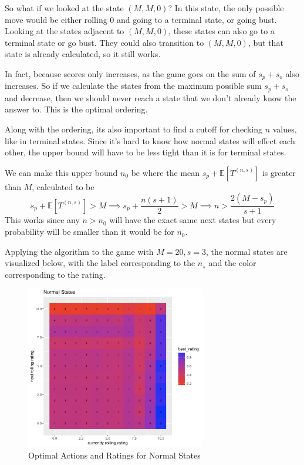 \documentclass[a4paper]{article}
\begin{document}
So what if we looked at the state $(M, M, 0)$? In this state, the only possible move would be either rolling $0$ and going to a terminal state, or going bust. Looking at the states adjacent to $(M, M, 0)$, these states can also go to a terminal state or go bust. They could also transition to $(M, M, 0)$, but that state is already calculated, so it still works. 

In fact, because scores only increases, as the game goes on the sum of $s_p + s_o$ also increases. So if we calculate the states from the maximum possible sum $s_p + s_o$ and decrease, then we should never reach a state that we don't already know the answer to. This is the optimal ordering.


Along with the ordering, its also important to find a cutoff for checking $n$ values, like in terminal states. Since it's hard to know how normal states will effect each other, the upper bound will have to be less tight than it is for terminal states. 

We can make this upper bound $n_0$ be where the mean $s_p + \mathbb{E}[T^{(n, s)}]$ is greater than $M$, calculated to be
%
$$
s_p + \mathbb{E}[T^{(n, s)}] > M \implies s_p + \frac{n(s+1)}{2} > M \implies n > \frac{2(M - s_p)}{s+1}
$$
%
This works since any $n > n_0$ will have the exact same next states but every probability will be smaller than it would be for $n_0$. \newline


Applying the algorithm to the game with $M = 20, s = 3$, the normal states are visualized below, with the label corresponding to the $n_{\star}$ and the color corresponding to the rating.

\begin{figure}[h]
    \centering
    \includegraphics[width=0.7\textwidth]{Screenshot 2023-12-14 at 01.43.15.png}
    \caption{Optimal Actions and Ratings for Normal States}
\end{figure}
\end{document}
